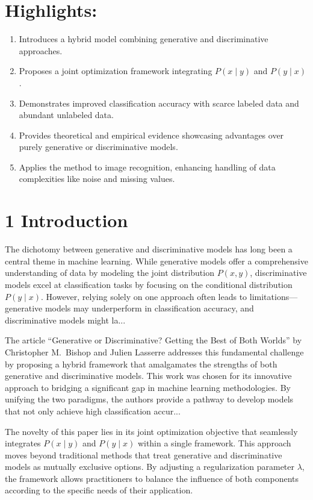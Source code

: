 \documentclass[12pt]{article}
\begin{document}
\section*{Highlights:}
\begin{enumerate}
    \item Introduces a hybrid model combining generative and discriminative approaches.
    \item Proposes a joint optimization framework integrating \( P(x \mid y) \) and \( P(y \mid x) \).
    \item Demonstrates improved classification accuracy with scarce labeled data and abundant unlabeled data.
    \item Provides theoretical and empirical evidence showcasing advantages over purely generative or discriminative models.
    \item Applies the method to image recognition, enhancing handling of data complexities like noise and missing values.
\end{enumerate}

\section*{1 Introduction}

The dichotomy between generative and discriminative models has long been a central theme in machine learning. While generative models offer a comprehensive understanding of data by modeling the joint distribution \( P(x, y) \), discriminative models excel at classification tasks by focusing on the conditional distribution \( P(y \mid x) \). However, relying solely on one approach often leads to limitations---generative models may underperform in classification accuracy, and discriminative models might la...

The article ``Generative or Discriminative? Getting the Best of Both Worlds'' by Christopher M.~Bishop and Julien Lasserre addresses this fundamental challenge by proposing a hybrid framework that amalgamates the strengths of both generative and discriminative models. This work was chosen for its innovative approach to bridging a significant gap in machine learning methodologies. By unifying the two paradigms, the authors provide a pathway to develop models that not only achieve high classification accur...

The novelty of this paper lies in its joint optimization objective that seamlessly integrates \( P(x \mid y) \) and \( P(y \mid x) \) within a single framework. This approach moves beyond traditional methods that treat generative and discriminative models as mutually exclusive options. By adjusting a regularization parameter \( \lambda \), the framework allows practitioners to balance the influence of both components according to the specific needs of their application.
\end{document}

